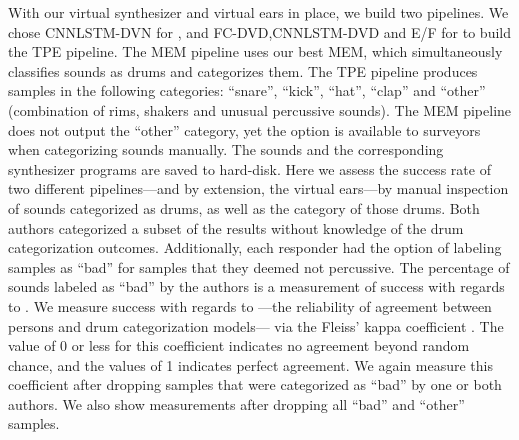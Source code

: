 \documentclass[runningheads,a4paper]{llncs}
\begin{document}
 \begin{table}
\caption{\label{kappa_table_MEM}Table of Fleiss' kappa coefficient to measure the degree of agreement between persons (H+H) and persons with MEM (H+MEM).}
\end{table}
With our virtual synthesizer and virtual ears in place, we build two pipelines. We chose CNNLSTM-DVN for , and FC-DVD,CNNLSTM-DVD and E/F for  to build the TPE pipeline. The MEM pipeline uses our best MEM, which simultaneously classifies sounds as drums and categorizes them. 
The TPE pipeline produces samples in the following categories: \enquote{snare}, \enquote{kick}, \enquote{hat}, \enquote{clap} and \enquote{other} (combination of rims, shakers and unusual percussive sounds). The MEM pipeline does not output the \enquote{other} category, yet the option is available to surveyors when categorizing sounds manually.   
The sounds and the corresponding synthesizer programs are saved to hard-disk. Here we assess the success rate of two different pipelines---and by extension, the virtual ears---by manual inspection of sounds categorized as drums, as well as the category of those drums. Both authors categorized a subset of the results without knowledge of the drum categorization outcomes. Additionally, each responder had the option of labeling samples as \enquote{bad} for samples that they deemed not percussive.  The percentage of sounds labeled as \enquote{bad} by the authors is a measurement of success with regards to . We measure success with regards to ---the reliability of agreement between persons and drum categorization models--- via the Fleiss' kappa coefficient \cite{fleiss1971measuring}. The value of 0 or less for this coefficient indicates no agreement beyond random chance, and the values of 1 indicates perfect agreement. We again measure this coefficient after dropping samples that were categorized as \enquote{bad} by one or both authors. We also show measurements after dropping all \enquote{bad} and \enquote{other} samples.
\end{document}
